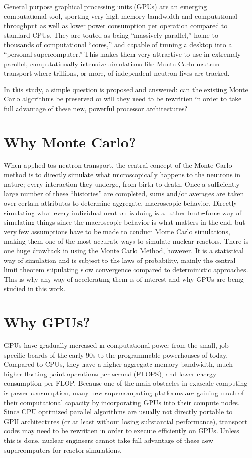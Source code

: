 General purpose graphical processing units (GPUs) are an emerging computational tool, sporting very high memory bandwidth and computational throughput as well as lower power consumption per operation compared to standard CPUs.  They are touted as being ``massively parallel,'' home to thousands of computational ``cores,'' and capable of turning a desktop into a ``personal supercomputer.''  This makes them very attractive to use in extremely parallel, computationally-intensive simulations like Monte Carlo neutron transport where trillions, or more, of independent neutron lives are tracked.  

In this study, a simple question is proposed and answered: can the existing Monte Carlo algorithms be preserved or will they need to be rewritten in order to take full advantage of these new, powerful processor architectures?

\section{Why Monte Carlo?}

When applied tos neutron transport, the central concept of the Monte Carlo method is to directly simulate what  microscopically happens to the neutrons in nature; every interaction they undergo, from birth to death.  Once a sufficiently large number of these ``histories'' are completed, sums and/or averages are taken over certain attributes to determine aggregate, macroscopic behavior.  Directly simulating what every individual neutron is doing is a rather brute-force way of simulating things since the macroscopic behavior is what matters in the end, but very few assumptions have to be made to conduct Monte Carlo simulations, making them one of the most accurate ways to simulate nuclear reactors.  There is one huge drawback in using the Monte Carlo Method, however.  It is a statistical way of simulation and is subject to the laws of probability, mainly the central limit theorem stipulating slow convergence compared to deterministic approaches.  This is why any way of accelerating them is of interest and why GPUs are being studied in this work.

\section{Why GPUs?}

GPUs have gradually increased in computational power from the small, job-specific boards of the early 90s to the programmable powerhouses of today.  Compared to CPUs, they have a higher aggregate memory bandwidth, much higher floating-point operations per second (FLOPS), and lower energy consumption per FLOP.  Because one of the main obstacles in exascale computing is power consumption, many new supercomputing platforms are gaining much of their computational capacity by incorporating GPUs into their compute nodes.  Since CPU optimized parallel algorithms are usually not directly portable to GPU architectures (or at least without losing substantial performance), transport codes may need to be rewritten in order to execute efficiently on GPUs.  Unless this is done, nuclear engineers cannot take full advantage of these new supercomputers for reactor simulations.

